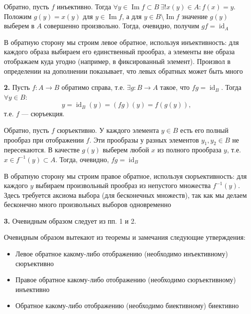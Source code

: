 \documentclass[a4paper,12pt]{article}
\theoremstyle{definition}
\theoremstyle{plain}
\theoremstyle{remark}
\begin{document}
	\medskip
	Обратно, пусть $f$ инъективно. Тогда $\forall y \in \operatorname{Im} f \subset B \ \exists! x(y) \in A \colon f(x) = y$. Положим $g(y) = x(y)$ для $y \in \operatorname{Im} f$, а для $y \in B \setminus \operatorname{Im} f$ значение $g(y)$ выберем в $A$ совершенно произвольно. Тогда, очевидно, получим $gf = \operatorname{id}_A$
	
	\begin{tcolorbox}[colback=blue!5, colframe=blue!40!black, title=Пояснение к пункту 1]
		В обратную сторону мы строим левое обратное, используя инъективность: для каждого образа выбираем его единственный прообраз, а элементы вне образа отображаем куда угодно (например, в фиксированный элемент). Произвол в определении на дополнении показывает, что левых обратных может быть много
	\end{tcolorbox}
	
	\textbf{2.} Пусть $f \colon A \to B$ обратимо справа, т.е. $\exists g \colon B \to A$ такое, что $fg = \operatorname{id}_B$. Тогда $\forall y \in B$:
	\[
	y = \operatorname{id}_B(y) = (fg)(y) = f(g(y)),
	\]
	т.е. $f$ — сюръекция.
	
	\medskip
	Обратно, пусть $f$ сюръективно. У каждого элемента $y \in B$ есть его полный прообраз при отображении $f$. Эти прообразы у разных элементов $y_1, y_2 \in B$ не пересекаются. В качестве $g(y)$ выберем любой $x$ из полного прообраза $y$, т.е. $x \in f^{-1}(y) \subset A$. Тогда, очевидно, $fg = \operatorname{id}_B$
	
	\begin{tcolorbox}[colback=blue!5, colframe=blue!40!black, title=Пояснение к пункту 2]
		В обратную сторону мы строим правое обратное, используя сюръективность: для каждого $y$ выбираем произвольный прообраз из непустого множества $f^{-1}(y)$. Здесь требуется аксиома выбора (для бесконечных множеств), так как мы делаем бесконечно много произвольных выборов одновременно
	\end{tcolorbox}
	
	\textbf{3.} Очевидным образом следует из пп. 1 и 2.
	
	\begin{tcolorbox}[colback=red!5, colframe=red!70!black, title=Следствие теоремы]
		Очевидным образом вытекают из теоремы и замечания следующие утверждения:
		\begin{itemize}
			\item Левое обратное какому-либо отображению (необходимо инъективному) сюръективно
			\item Правое обратное какому-либо отображению (необходимо сюръективному) инъективно
			\item Обратное какому-либо отображению (необходимо биективному) биективно
		\end{itemize}
	\end{tcolorbox}
	
\end{document}
